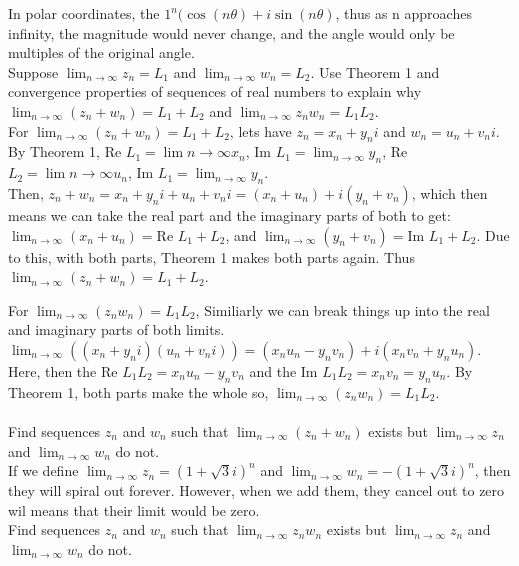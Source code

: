 \documentclass[12pt]{article}
\begin{document}
In polar coordinates, the $1^n(\cos(n\theta) + i\sin(n\theta)$, thus as n approaches infinity, the magnitude would never change, and the angle would only be multiples of the original angle.\\


 Suppose $ \lim_{n\to\infty} z_n = L_1$ and $\lim_{n\to\infty} w_n = L_2$.  
Use Theorem 1 and convergence properties of sequences of real numbers to explain why 
$\lim_{n\to\infty} (z_n + w_n) = L_1 + L_2$ and $\lim_{n\to\infty} z_nw_n = L_1L_2$.\\

For $\lim_{n\to\infty} (z_n + w_n) = L_1 + L_2$, 
lets have $z_n = x_n + y_ni$ and $w_n = u_n + v_ni$.
By Theorem 1, Re $L_1 = \lim{n\to\infty} x_n $, Im $L_1 = \lim_{n\to\infty} y_n$, Re $L_2 = \lim{n\to\infty} u_n$, Im $L_1 = \lim_{n\to\infty} y_n$.\\

Then, $z_n + w_n = x_n + y_ni + u_n + v_ni = (x_n+u_n) + i(y_n+v_n)$, which then means we can take the real part and the imaginary parts of both to get:
$\lim_{n\to\infty} (x_n+u_n) = $Re $ L_1 + L_2$, and $\lim_{n\to\infty} (y_n+v_n) = $Im $ L_1 + L_2$.
Due to this, with both parts, Theorem 1 makes both parts again. 
Thus $\lim_{n\to\infty} (z_n + w_n) = L_1 + L_2$. 


For $\lim_{n\to\infty} (z_nw_n) = L_1L_2$,
Similiarly we can break things up into the real and imaginary parts of both limits.
$\lim_{n\to\infty} ((x_n+y_ni)(u_n+v_ni)) = (x_nu_n - y_nv_n) + i(x_nv_n + y_nu_n)$.
Here, then the Re $L_1L_2 = x_nu_n - y_nv_n$ and the Im $L_1L_2 = x_nv_n = y_nu_n$. 
By Theorem 1, both parts make the whole so, $\lim_{n\to\infty} (z_nw_n) = L_1L_2$.\\


 \\

 Find sequences $z_n$ and $w_n$ such that $\lim_{n\to\infty} (z_n + w_n)$ exists but $\lim_{n\to\infty} z_n$ and  $\lim_{n\to\infty} w_n$ do not.\\

If we define $\lim_{n\to\infty} z_n = (1 + \sqrt{3}i)^n$ and $\lim_{n\to\infty} w_n = -(1 + \sqrt{3}i)^n$, then they will spiral out forever.
However, when we add them, they cancel out to zero wil means that their limit would be zero.\\

 Find sequences $z_n$ and $w_n$ such that $\lim_{n\to\infty} z_nw_n$ exists but $\lim_{n\to\infty} z_n$ and  $\lim_{n\to\infty} w_n$ do not.\\
\end{document}
